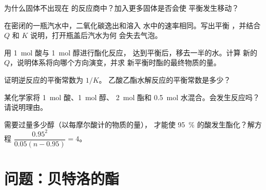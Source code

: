 \begin{exercise}[$\star\star$]\label{exo:g12:equilibrium:10}
为什么固体不出现在
 的反应商中？加入更多固体是否会使
平衡发生移动？
\end{exercise}

\begin{exercise}[$\star\star$]\label{exo:g12:equilibrium:11}
在密闭的一瓶汽水中，二氧化碳逸出和溶入
水中的速率相同。写出平衡
，并结合 $Q$ 和 $K$ 说明，打开瓶盖后汽水为何
会失去气泡。
\end{exercise}

\begin{exercise}[$\star\star\star$]\label{exo:g12:equilibrium:12}
用 \qty{1}{mol} 酸与 \qty{1}{mol} 醇进行酯化反应，
达到平衡后，移去一半的水。计算
新的 $Q$，说明体系将向哪个方向演变，并求
新平衡时酯的最终物质的量。
\end{exercise}

\begin{exercise}[$\star\star\star$]\label{exo:g12:equilibrium:13}
证明逆反应的平衡常数为 $1/K$。
乙酸乙酯水解反应的平衡常数是多少？
\end{exercise}

\begin{exercise}[$\star\star\star$]\label{exo:g12:equilibrium:14}
某化学家将 \qty{1}{mol} 酸、\qty{1}{mol} 醇、
\qty{2}{mol} 酯和 \qty{0.5}{mol} 水混合。会发生反应吗？
请说明理由。
\end{exercise}

\begin{exercise}[$\star\star\star$]\label{exo:g12:equilibrium:15}
需要过量多少醇（以每摩尔酸计的物质的量），
才能使 \qty{95}{\percent} 的酸发生酯化？解方程 $\dfrac{0.95^2}{0.05(n - 0.95)} =
4$。
\end{exercise}

\section{问题：贝特洛的酯}

